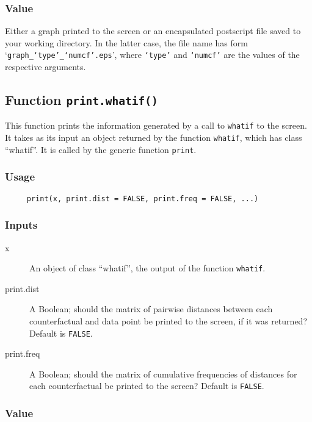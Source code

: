 \documentclass[oneside,letterpaper,titlepage]{article}
\begin{document}
\subsubsection{Value}

Either a graph printed to the screen or an encapsulated postscript
file saved to your working directory.  In the latter case, the file
name has form `\texttt{graph\_`type'\_`numcf'.eps}', where \texttt{`type'} and
\texttt{`numcf'} are the values of the respective arguments.

\subsection{Function \texttt{print.whatif()}}

This function prints the information generated by a call to
\texttt{whatif} to the screen.  It takes as its input an object
returned by the function \texttt{whatif}, which has class ``whatif''.
It is called by the generic function \texttt{print}.

\subsubsection{Usage}

\begin{verbatim}
     print(x, print.dist = FALSE, print.freq = FALSE, ...)
\end{verbatim}

\subsubsection{Inputs}

\begin{description}
  \item[x] An object of class ``whatif'', the output of the
    function \texttt{whatif}.
  \item[print.dist] A Boolean; should the matrix of pairwise 
    distances between each counterfactual and data point be printed to
    the screen, if it was returned?  Default is \texttt{FALSE}.
  \item[print.freq] A Boolean; should the matrix of cumulative
    frequencies of distances for each counterfactual be printed
    to the screen?  Default is \texttt{FALSE}.
\end{description}

\subsubsection{Value}
\end{document}
